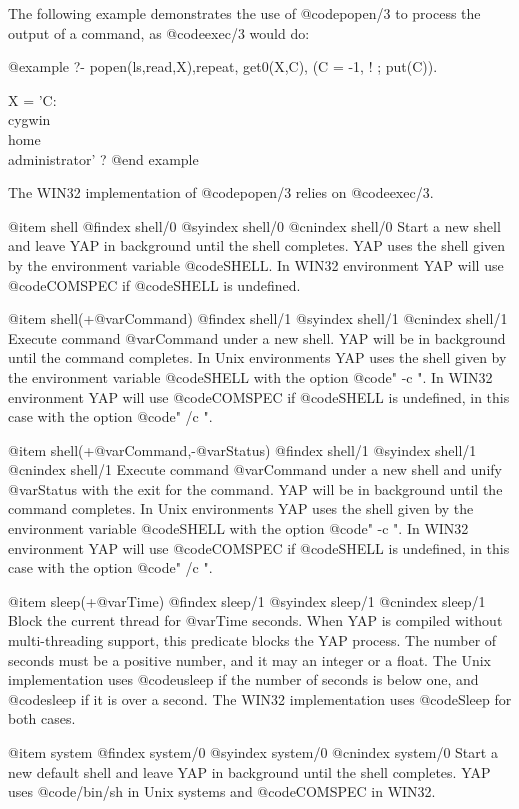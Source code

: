 {{{{{{{{{The following example demonstrates the use of @code{popen/3} to process
the output of a command, as @code{exec/3} would do:

@example
   ?- popen(ls,read,X),repeat, get0(X,C), (C = -1, ! ; put(C)).

X = 'C:\\cygwin\\home\\administrator' ?
@end example


The WIN32 implementation of @code{popen/3} relies on @code{exec/3}.

@item shell
@findex  shell/0
@syindex shell/0
@cnindex shell/0
Start a new shell and leave YAP in background until the shell
completes. YAP uses the shell given by the environment variable
@code{SHELL}. In WIN32 environment YAP will use @code{COMSPEC} if
@code{SHELL} is undefined.

@item shell(+@var{Command})
@findex  shell/1
@syindex shell/1
@cnindex shell/1
Execute command @var{Command} under a new shell. YAP will be in
background until the command completes. In Unix environments YAP uses
the shell given by the environment variable @code{SHELL} with the option
@code{" -c "}. In WIN32 environment YAP will use @code{COMSPEC} if
@code{SHELL} is undefined, in this case with the option @code{" /c "}.

@item shell(+@var{Command},-@var{Status})
@findex  shell/1
@syindex shell/1
@cnindex shell/1
Execute command @var{Command} under a new shell and unify @var{Status}
with the exit for the command. YAP will be in background until the
command completes. In Unix environments YAP uses the shell given by the
environment variable @code{SHELL} with the option @code{" -c "}. In
WIN32 environment YAP will use @code{COMSPEC} if @code{SHELL} is
undefined, in this case with the option @code{" /c "}.

@item sleep(+@var{Time})
@findex  sleep/1
@syindex sleep/1
@cnindex sleep/1
Block the current thread for @var{Time} seconds. When YAP is compiled 
without multi-threading support, this predicate blocks the YAP process. 
The number of seconds must be a positive number, and it may an integer 
or a float. The Unix implementation uses @code{usleep} if the number of 
seconds is below one, and @code{sleep} if it is over a second. The WIN32 
implementation uses @code{Sleep} for both cases.

@item system
@findex  system/0
@syindex system/0
@cnindex system/0
Start a new default shell and leave YAP in background until the shell
completes. YAP uses @code{/bin/sh} in Unix systems and @code{COMSPEC} in
WIN32.

}}}}}}}}}
